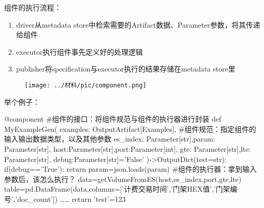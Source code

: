 \documentclass[notheorems, aspectratio=1610]{beamer}
\begin{document}
        

\begin{frame}
    \large 组件的执行流程：
    \begin{enumerate}
        \item driver从metadata store中检索需要的Artifact数据、Parameter参数，将其传递给组件
        \item executor执行组件事先定义好的处理逻辑
        \item publisher将specification与executor执行的结果存储在metadata store里
    \end{enumerate}
    \begin{figure}[h] %
        \centering %
        \texttt{[image: ../材料/pic/component.png]} %
    \end{figure}%
\end{frame}
\begin{frame}[fragile]
    
    \large 举个例子：
    \begin{python}[]
@component  #组件的接口：将组件规范与组件的执行器进行封装
def MyExampleGen(
    examples: OutputArtifact[Examples], #组件规范：指定组件的输入输出数据类型，以及其他参数
    es_index: Parameter[str],param: Parameter[str],
    host:Parameter[str],port:Parameter[int],
    gte: Parameter[str],lte: Parameter[str],
    debug:Parameter[str]='False'
    )->OutputDict(test=str):
    if(debug=='True'):
        return {
        }
    param=json.loads(param)       #组件的执行器：拿到输入参数后，该怎么执行？
    data=getVolumeFromES(host,es_index,port,gte,lte)
    table=pd.DataFrame(data,columns=['计费交易时间','门架HEX值','门架编号','doc_count'])
    ……
    return {
        'test'=123
    }
    \end{python}
\end{frame}
\end{document}

